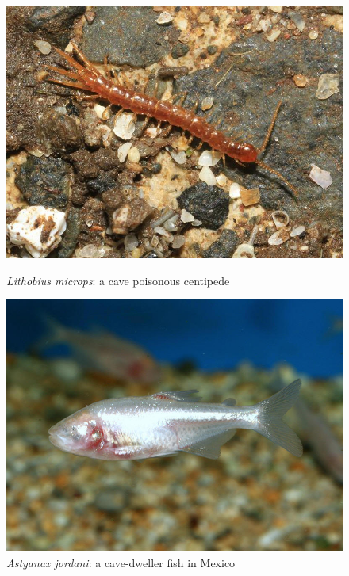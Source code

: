 \documentclass[draft, final]{report}
\begin{document}
\begin{figure}[!ht]
    \begin{minipage}[c]{.46\linewidth}
        \centering
        \includegraphics[scale=0.25]{LateX/Images/fnwickdavid.png}
        \caption{\emph{Lithobius microps}: a cave poisonous centipede\cite{fenwickdavid}}
    \end{minipage}
    \hfill%
    \begin{minipage}[c]{.46\linewidth}
        \centering
        \includegraphics[scale=0.25]{LateX/Images/cavefish2.png}
        \caption{\emph{Astyanax jordani}: a cave-dweller fish in Mexico\cite{rapsonandy}}
    \end{minipage}
\end{figure}
\end{document}
